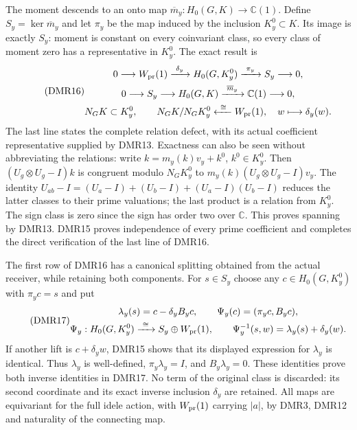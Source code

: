 The moment descends to an onto map
$\overline m_y:H_0(G,K)\to\mathbb C(1)$. Define
$S_y=\ker\overline m_y$ and let $\pi_y$ be the map induced by
the inclusion $K_y^0\subset K$. Its image is exactly $S_y$:
moment is constant on every coinvariant class, so every class
of moment zero has a representative in $K_y^0$.
The exact result is
\begin{equation}\tag{DMR16}
\begin{gathered}
0\longrightarrow W_{\rm pr}(1)
 \xrightarrow{\ \delta_y\ }H_0(G,K_y^0)
 \xrightarrow{\ \pi_y\ }S_y\longrightarrow0,\\
0\longrightarrow S_y\longrightarrow H_0(G,K)
 \xrightarrow{\ \overline m_y\ }\mathbb C(1)\longrightarrow0,\\
N_GK\subset K_y^0,\qquad
N_GK/N_GK_y^0\xleftarrow{\ \cong\ }W_{\rm pr}(1),
\quad w\longmapsto\delta_y(w).
\end{gathered}
\end{equation}
The last line states the complete relation defect, with its
actual coefficient representative supplied by DMR13. Exactness
can also be seen without abbreviating the relations: write
$k=m_y(k)v_y+k^0$, $k^0\in K_y^0$. Then
$(U_g\otimes U_g-I)k$ is congruent modulo $N_GK_y^0$ to
$m_y(k)(U_g\otimes U_g-I)v_y$.
The identity
$U_{ab}-I=(U_a-I)+(U_b-I)+(U_a-I)(U_b-I)$
reduces the latter classes to their prime valuations; the last
product is a relation from $K_y^0$. The sign class is zero
since the sign has order two over $\mathbb C$. This proves
spanning by DMR13. DMR15 proves independence of every prime
coefficient and completes the direct verification of the last
line of DMR16.

The first row of DMR16 has a canonical splitting obtained from
the actual receiver, while retaining both components. For $s\in S_y$
choose any $c\in H_0(G,K_y^0)$ with $\pi_yc=s$ and put
\begin{equation}\tag{DMR17}
\begin{gathered}
\lambda_y(s)=c-\delta_y B_yc,\qquad
\Psi_y(c)=(\pi_yc,B_yc),\\
\Psi_y:H_0(G,K_y^0)\xrightarrow{\ \cong\ }
                S_y\oplus W_{\rm pr}(1),\qquad
\Psi_y^{-1}(s,w)=\lambda_y(s)+\delta_y(w).
\end{gathered}
\end{equation}
If another lift is $c+\delta_yw$, DMR15 shows that its displayed
expression for $\lambda_y$ is identical. Thus $\lambda_y$ is
well-defined, $\pi_y\lambda_y=I$, and $B_y\lambda_y=0$.
These identities prove both inverse identities in DMR17. No
term of the original class is discarded: its second coordinate
and its exact inverse inclusion $\delta_y$ are retained.
All maps are equivariant for the full idele action, with
$W_{\rm pr}(1)$ carrying $|a|$, by DMR3, DMR12 and naturality
of the connecting map.

